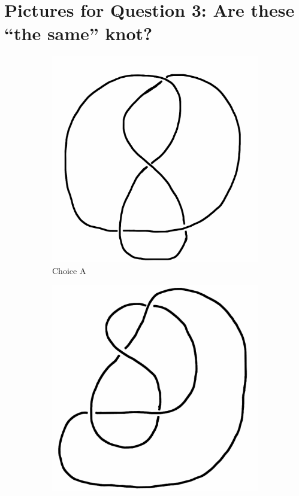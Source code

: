 \documentclass[12pt,letterpaper]{article}
\theoremstyle{definition}
\begin{document}
\clearpage

\section*{Pictures for Question 3: Are these ``the same'' knot?}

\begin{figure}[h!]
    \begin{subfigure}[b]{0.4\textwidth}
        \includegraphics[width=\textwidth]{knotpics/9SeptQ3a.png}
        \caption{Choice A}
    \end{subfigure}
    \hspace{2cm}
    \begin{subfigure}[b]{0.4\textwidth}
        \includegraphics[width=\textwidth]{knotpics/9SeptQ3b.png}

\end{subfigure}
\end{figure}
\end{document}
